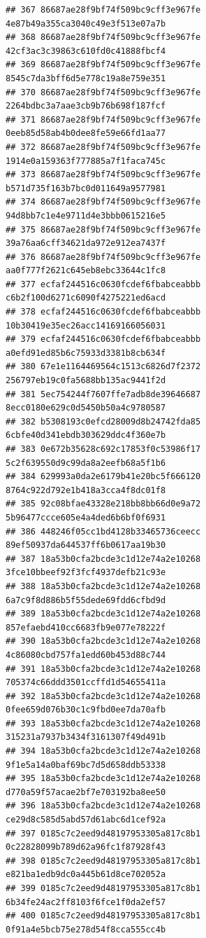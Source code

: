 \documentclass[]{article}
\begin{document}
\begin{verbatim}
## 367 86687ae28f9bf74f509bc9cff3e967fe     4e87b49a355ca3040c49e3f513e07a7b
## 368 86687ae28f9bf74f509bc9cff3e967fe     42cf3ac3c39863c610fd0c41888fbcf4
## 369 86687ae28f9bf74f509bc9cff3e967fe     8545c7da3bff6d5e778c19a8e759e351
## 370 86687ae28f9bf74f509bc9cff3e967fe     2264bdbc3a7aae3cb9b76b698f187fcf
## 371 86687ae28f9bf74f509bc9cff3e967fe     0eeb85d58ab4b0dee8fe59e66fd1aa77
## 372 86687ae28f9bf74f509bc9cff3e967fe     1914e0a159363f777885a7f1faca745c
## 373 86687ae28f9bf74f509bc9cff3e967fe     b571d735f163b7bc0d011649a9577981
## 374 86687ae28f9bf74f509bc9cff3e967fe     94d8bb7c1e4e9711d4e3bbb0615216e5
## 375 86687ae28f9bf74f509bc9cff3e967fe     39a76aa6cff34621da972e912ea7437f
## 376 86687ae28f9bf74f509bc9cff3e967fe     aa0f777f2621c645eb8ebc33644c1fc8
## 377 ecfaf244516c0630fcdef6fbabceabbb     c6b2f100d6271c6090f4275221ed6acd
## 378 ecfaf244516c0630fcdef6fbabceabbb     10b30419e35ec26acc14169166056031
## 379 ecfaf244516c0630fcdef6fbabceabbb     a0efd91ed85b6c75933d3381b8cb634f
## 380 67e1e1164469564c1513c6826d7f2372     256797eb19c0fa5688bb135ac9441f2d
## 381 5ec754244f7607ffe7adb8de39646687     8ecc0180e629c0d5450b50a4c9780587
## 382 b5308193c0efcd28009d8b24742fda85     6cbfe40d341ebdb303629ddc4f360e7b
## 383 0e672b35628c692c17853f0c53986f17     5c2f639550d9c99da8a2eefb68a5f1b6
## 384 629993a0da2e6179b41e20bc5f666120     8764c922d792e1b418a3cca4f8dc01f8
## 385 92c08bfae43328e218bb8bb66d0e9a72     5b96477ccce605e4a4ded6b6bf0f6931
## 386 448246f05cc1bd4128b33465736ceecc     89ef50937da644537ff6b0617aa19b30
## 387 18a53b0cfa2bcde3c1d12e74a2e10268     3fce10bbeef92f3fcf4937defb21c93e
## 388 18a53b0cfa2bcde3c1d12e74a2e10268     6a7c9f8d886b5f55dede69fdd6cfbd9d
## 389 18a53b0cfa2bcde3c1d12e74a2e10268     857efaebd410cc6683fb9e077e78222f
## 390 18a53b0cfa2bcde3c1d12e74a2e10268     4c86080cbd757fa1edd60b453d88c744
## 391 18a53b0cfa2bcde3c1d12e74a2e10268     705374c66ddd3501ccffd1d54655411a
## 392 18a53b0cfa2bcde3c1d12e74a2e10268     0fee659d076b30c1c9fbd0ee7da70afb
## 393 18a53b0cfa2bcde3c1d12e74a2e10268     315231a7937b3434f3161307f49d491b
## 394 18a53b0cfa2bcde3c1d12e74a2e10268     9f1e5a14a0baf69bc7d5d658ddb53338
## 395 18a53b0cfa2bcde3c1d12e74a2e10268     d770a59f57acae2bf7e703192ba8ee50
## 396 18a53b0cfa2bcde3c1d12e74a2e10268     ce29d8c585d5abd57d61abc6d1cef92a
## 397 0185c7c2eed9d48197953305a817c8b1     0c22828099b789d62a96fc1f87928f43
## 398 0185c7c2eed9d48197953305a817c8b1     e821ba1edb9dc0a445b61d8ce702052a
## 399 0185c7c2eed9d48197953305a817c8b1     6b34fe24ac2ff8103f6fce1f0da2ef57
## 400 0185c7c2eed9d48197953305a817c8b1     0f91a4e5bcb75e278d54f8cca555cc4b

\end{verbatim}
\end{document}
